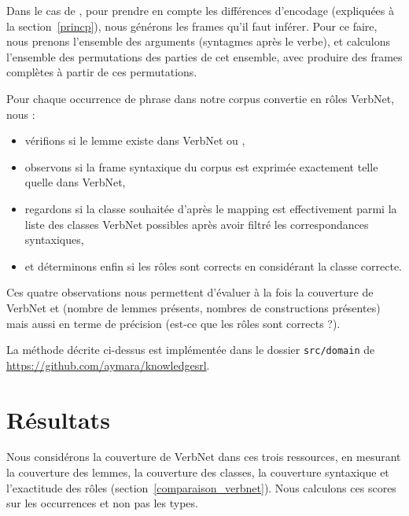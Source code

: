 Dans le cas de \verbenet{}, pour prendre en compte les différences d'encodage
(expliquées à la section~\ref{princp}), nous générons les frames qu'il faut
inférer. Pour ce faire, nous prenons l'ensemble des arguments (syntagmes après
le verbe), et calculons l'ensemble des permutations des parties de cet
ensemble, avec produire des frames complètes à partir de ces permutations.

Pour chaque occurrence de phrase dans notre corpus convertie en rôles VerbNet,
nous :
\begin{itemize}
    \item vérifions si le lemme existe dans VerbNet ou \verbenet{},
    \item observons si la frame syntaxique du corpus est exprimée exactement
        telle quelle dans VerbNet,
    \item regardons si la classe souhaitée d'après le mapping est effectivement
        parmi la liste des classes VerbNet possibles après avoir filtré les
        correspondances syntaxiques,
    \item et déterminons enfin si les rôles sont corrects en considérant la
        classe correcte.
\end{itemize}

Ces quatre observations nous permettent d'évaluer à la fois la couverture de
VerbNet et \verbenet{} (nombre de lemmes présents, nombres de constructions
présentes) mais aussi en terme de précision (est-ce que les rôles sont corrects
?).

La méthode décrite ci-dessus est implémentée dans le dossier
\texttt{src/domain} de \url{https://github.com/aymara/knowledgesrl}.

\section{Résultats}
\label{sec:domainsrlresults}

Nous considérons la couverture de VerbNet dans ces trois ressources, en
mesurant la couverture des lemmes, la couverture des classes, la couverture
syntaxique et l'exactitude des rôles (section~\ref{comparaison_verbnet}). Nous
calculons ces scores sur les occurrences et non pas les types.


